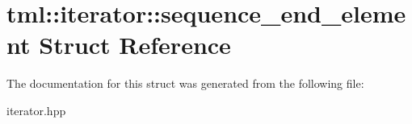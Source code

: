 \hypertarget{structtml_1_1iterator_1_1sequence__end__element}{\section{tml\+:\+:iterator\+:\+:sequence\+\_\+end\+\_\+element Struct Reference}
\label{structtml_1_1iterator_1_1sequence__end__element}
}


The documentation for this struct was generated from the following file\+:\begin{DoxyCompactItemize}
\item 
iterator.\+hpp\end{DoxyCompactItemize}

